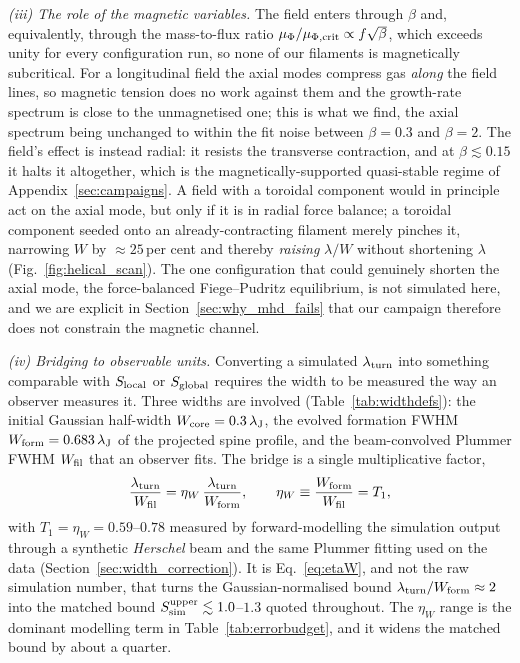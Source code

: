 \documentclass[usenatbib,twoside,twocolumn]{mnras}
\begin{document}
\smallskip\noindent\emph{(iii) The role of the magnetic variables.} The field enters through $\beta$ and, equivalently, through the mass-to-flux ratio $\mu_\Phi/\mu_{\Phi,\rm crit}\propto f\sqrt{\beta}$, which exceeds unity for every configuration run, so none of our filaments is magnetically subcritical. For a longitudinal field the axial modes compress gas \emph{along} the field lines, so magnetic tension does no work against them and the growth-rate spectrum is close to the unmagnetised one; this is what we find, the axial spectrum being unchanged to within the fit noise between $\beta=0.3$ and $\beta=2$. The field's effect is instead radial: it resists the transverse contraction, and at $\beta\lesssim0.15$ it halts it altogether, which is the magnetically-supported quasi-stable regime of Appendix~\ref{sec:campaigns}. A field with a toroidal component would in principle act on the axial mode, but only if it is in radial force balance; a toroidal component seeded onto an already-contracting filament merely pinches it, narrowing $W$ by $\approx25$\,per cent and thereby \emph{raising} $\lambda/W$ without shortening $\lambda$ (Fig.~\ref{fig:helical_scan}). The one configuration that could genuinely shorten the axial mode, the force-balanced Fiege--Pudritz equilibrium, is not simulated here, and we are explicit in Section~\ref{sec:why_mhd_fails} that our campaign therefore does not constrain the magnetic channel.

\smallskip\noindent\emph{(iv) Bridging to observable units.} Converting a simulated $\lambda_{\rm turn}$ into something comparable with $S_{\rm local}$ or $S_{\rm global}$ requires the width to be measured the way an observer measures it. Three widths are involved (Table~\ref{tab:widthdefs}): the initial Gaussian half-width $W_{\rm core}=0.3\,\lambda_{\rm J}$, the evolved formation FWHM $W_{\rm form}=0.683\,\lambda_{\rm J}$ of the projected spine profile, and the beam-convolved Plummer FWHM $W_{\rm fil}$ that an observer fits. The bridge is a single multiplicative factor,
\begin{equation}
\frac{\lambda_{\rm turn}}{W_{\rm fil}}=\eta_W\,\frac{\lambda_{\rm turn}}{W_{\rm form}},
\qquad \eta_W\equiv\frac{W_{\rm form}}{W_{\rm fil}}=T_1,
\label{eq:etaW}
\end{equation}
with $T_1=\eta_W=0.59$--$0.78$ measured by forward-modelling the simulation output through a synthetic \textit{Herschel} beam and the same Plummer fitting used on the data (Section~\ref{sec:width_correction}). It is Eq.~\ref{eq:etaW}, and not the raw simulation number, that turns the Gaussian-normalised bound $\lambda_{\rm turn}/W_{\rm form}\approx2$ into the matched bound $S_{\rm sim}^{\rm upper}\lesssim1.0$--$1.3$ quoted throughout. The $\eta_W$ range is the dominant modelling term in Table~\ref{tab:errorbudget}, and it widens the matched bound by about a quarter.
\end{document}
